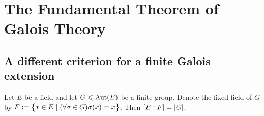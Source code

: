 \documentclass[11pt,a4paper]{article}
\begin{document}
\newpage

\section{The Fundamental Theorem of Galois Theory}

\subsection{A different criterion for a finite Galois extension}

\begin{theorem}[Artin]
  \label{thm:artin}
  Let $E$ be a field and let $G \leqslant \operatorname{Aut}(E)$ be a finite group.
  Denote the fixed field of $G$ by
  $F := \left\{x \in E \mid (\forall \sigma \in G) \sigma(x) = x\right\}$.
  Then $[E : F] = \left\lvert G\right\rvert$.
\end{theorem}
\end{document}
